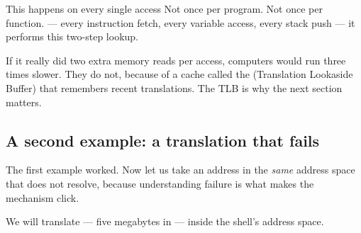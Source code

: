 \begin{center}
\end{center}

\begin{concept}{This happens on every single access}
Not once per program. Not once per function.  --- every instruction fetch, every variable access, every stack push --- it performs this
two-step lookup.

If it really did two extra memory reads per access, computers would run three times slower. They do
not, because of a cache called the  (Translation Lookaside Buffer) that remembers recent
translations. The TLB is why the next section matters.
\end{concept}

\subsection{A second example: a translation that fails}

The first example worked. Now let us take an address in the \emph{same} address space that does not
resolve, because understanding failure is what makes the mechanism click.

We will translate  --- five megabytes in --- inside the shell's address space.

